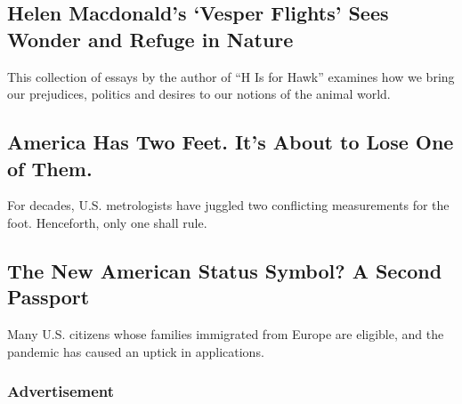 \hypertarget{helen-macdonalds-vesper-flights-sees-wonder-and-refuge-in-nature}{%
\subsection{Helen Macdonald's `Vesper Flights' Sees Wonder and Refuge in
Nature}\label{helen-macdonalds-vesper-flights-sees-wonder-and-refuge-in-nature}}

\href{/2020/08/18/books/review-vesper-flights-helen-macdonald.html}{}

This collection of essays by the author of ``H Is for Hawk'' examines
how we bring our prejudices, politics and desires to our notions of the
animal world.

\href{/2020/08/18/books/review-vesper-flights-helen-macdonald.html}{}

\href{/2020/08/18/science/foot-surveying-metrology-dennis.html}{}

\hypertarget{america-has-two-feet-its-about-to-lose-one-of-them}{%
\subsection{America Has Two Feet. It's About to Lose One of
Them.}\label{america-has-two-feet-its-about-to-lose-one-of-them}}

For decades, U.S. metrologists have juggled two conflicting measurements
for the foot. Henceforth, only one shall rule.

\href{/2020/08/18/science/foot-surveying-metrology-dennis.html}{}

\href{/2020/08/20/style/golden-visa-second-passport-dual-citizenship.html}{}

\hypertarget{the-new-american-status-symbol-a-second-passport}{%
\subsection{The New American Status Symbol? A Second
Passport}\label{the-new-american-status-symbol-a-second-passport}}

Many U.S. citizens whose families immigrated from Europe are eligible,
and the pandemic has caused an uptick in applications.

\href{/2020/08/20/style/golden-visa-second-passport-dual-citizenship.html}{}

\hypertarget{advertisement}{%
\subsubsection{Advertisement}\label{advertisement}}

